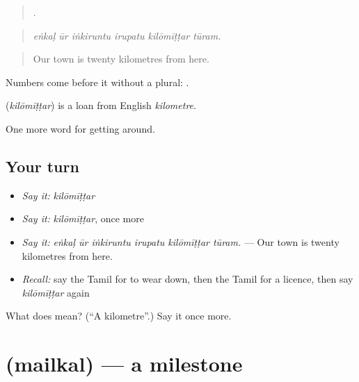 \begin{quote}
     .
\end{quote}

\begin{quote}
\emph{eṅkaḷ ūr iṅkiruntu irupatu kilōmīṭṭar tūram.}
\end{quote}

\begin{quote}
Our town is twenty kilometres from here.
\end{quote}

Numbers come before it without a plural:  .

\begin{cousinweb}
\textbf{} (\emph{kilōmīṭṭar}) is a loan from English \emph{kilometre}.
\end{cousinweb}

\begin{grammarlens}[title={What you've built}]
One more word for getting around.
\end{grammarlens}

\subsection*{Your turn}
\begin{itemize}
\raggedright
  \item \emph{Say it:} \emph{kilōmīṭṭar}
  \item \emph{Say it:} \emph{kilōmīṭṭar}, once more
  \item \emph{Say it:} \emph{eṅkaḷ ūr iṅkiruntu irupatu kilōmīṭṭar tūram.} — Our town is twenty kilometres from here.
  \item \emph{Recall:} say the Tamil for to wear down, then the Tamil for a licence, then say \emph{kilōmīṭṭar} again
\end{itemize}

\begin{tcolorbox}[breakable,colback=teal!4,colframe=teal!35!black,title={Before you move on}]
What does  mean? (\textquotedblleft{}A kilometre\textquotedblright{}.) Say it once more.
\end{tcolorbox}
\section[\texorpdfstring{\ta{மைல்கல்} (mailkal)}{மைல்கல் (mailkal)}]{ (mailkal) — a milestone}

